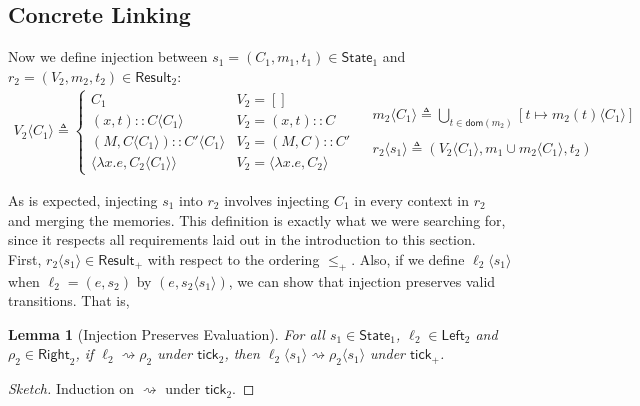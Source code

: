 \documentclass[acmsmall,review]{acmart}\settopmatter{printfolios=true,printccs=false,printacmref=false}
\theoremstyle{definition}
\theoremstyle{plain}
\newtheorem{lem}{Lemma}[section]
\newcommand*{\cons}{::}
\newcommand*{\Left}{\mathsf{Left}}
\newcommand*{\Right}{\mathsf{Right}}
\newcommand*{\mem}{m}
\newcommand*{\State}{\mathsf{State}}
\newcommand*{\Result}{\mathsf{Result}}
\newcommand*{\semarrow}{\rightsquigarrow}
\newcommand*{\tick}{\mathsf{tick}}
\newcommand*{\inject}[2]{{#2}\langle{#1}\rangle}
\begin{document}
\subsection{Concrete Linking}
Now we define injection between $s_1=(C_1,\mem_1,t_1)\in\State_1$ and $r_2=(V_2,\mem_2,t_2)\in\Result_2$:
\[
  \begin{array}{cc}
    \inject{C_{1}}{V_{2}}\triangleq
    \begin{cases}
      C_1                                           & V_{2}=[]                            \\
      (x, t)\cons\inject{C_{1}}{C}                  & V_{2}=(x,t)\cons C                  \\
      (M, \inject{C_{1}}{C})\cons\inject{C_{1}}{C'} & V_{2}=(M,C)\cons C'                 \\
      \langle\lambda x.e,\inject{C_1}{C_2}\rangle   & V_{2}=\langle\lambda x.e,C_2\rangle
    \end{cases} &
    \begin{array}{l}
      \inject{C_1}{\mem_2}\triangleq
      \displaystyle\bigcup_{t\in\mathsf{dom}(\mem_2)}[t\mapsto\inject{C_1}{\mem_2(t)}] \\ \\
      \inject{s_1}{r_2}\triangleq
      (\inject{C_1}{V_2},\mem_1\cup\inject{C_1}{\mem_2},t_2)
    \end{array}
  \end{array}
\]

As is expected, injecting $s_1$ into $r_2$ involves injecting $C_1$ in every context in $r_2$ and merging the memories.
This definition is exactly what we were searching for, since it respects all requirements laid out in the introduction to this section.
First, $\inject{s_1}{r_2}\in\Result_+$ with respect to the ordering $\le_+$.
Also, if we define $\inject{s_1}{\ell_2}$ when $\ell_2=(e,s_2)$ by $(e,\inject{s_1}{s_2})$, we can show that injection preserves valid transitions. That is,
\begin{lem}[Injection Preserves Evaluation]
  For all $s_1\in\State_1$, $\ell_2\in\Left_2$ and $\rho_2\in\Right_2$,
  if $\ell_2\semarrow\rho_2$ under $\tick_2$, then $\inject{s_1}{\ell_2}\semarrow\inject{s_1}{\rho_2}$ under $\tick_+$.
\end{lem}
\begin{proof}[Sketch]
  Induction on $\semarrow$ under $\tick_2$.
\end{proof}
\end{document}
